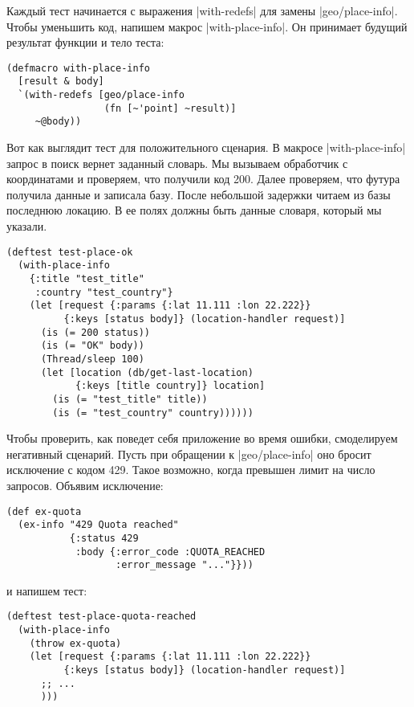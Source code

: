Каждый тест начинается с выражения \spverb|with-redefs| для замены
\spverb|geo/place-info|. Чтобы уменьшить код, напишем макрос
\spverb|with-place-info|. Он принимает будущий результат функции и тело теста:

\begin{verbatim}
(defmacro with-place-info
  [result & body]
  `(with-redefs [geo/place-info
                 (fn [~'point] ~result)]
     ~@body))
\end{verbatim}

Вот как выглядит тест для положительного сценария. В макросе
\spverb|with-place-info| запрос в поиск вернет заданный словарь. Мы вызываем
обработчик с координатами и проверяем, что получили код 200. Далее проверяем,
что футура получила данные и записала базу. После небольшой задержки читаем из
базы последнюю локацию. В ее полях должны быть данные словаря, который мы
указали.

\begin{verbatim}
(deftest test-place-ok
  (with-place-info
    {:title "test_title"
     :country "test_country"}
    (let [request {:params {:lat 11.111 :lon 22.222}}
          {:keys [status body]} (location-handler request)]
      (is (= 200 status))
      (is (= "OK" body))
      (Thread/sleep 100)
      (let [location (db/get-last-location)
            {:keys [title country]} location]
        (is (= "test_title" title))
        (is (= "test_country" country))))))
\end{verbatim}

Чтобы проверить, как поведет себя приложение во время ошибки, смоделируем
негативный сценарий. Пусть при обращении к \spverb|geo/place-info| оно бросит
исключение с кодом 429. Такое возможно, когда превышен лимит на число
запросов. Объявим исключение:

\begin{verbatim}
(def ex-quota
  (ex-info "429 Quota reached"
           {:status 429
            :body {:error_code :QUOTA_REACHED
                   :error_message "..."}}))
\end{verbatim}

\noindent
и напишем тест:

\begin{verbatim}
(deftest test-place-quota-reached
  (with-place-info
    (throw ex-quota)
    (let [request {:params {:lat 11.111 :lon 22.222}}
          {:keys [status body]} (location-handler request)]
      ;; ...
      )))
\end{verbatim}


